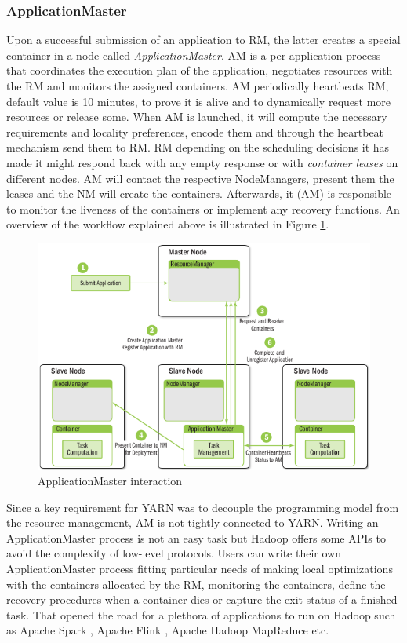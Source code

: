 \subsubsection{ApplicationMaster}
\label{sssec:am}
Upon a successful submission of an application to RM, the latter
creates a special container in a node called
\emph{ApplicationMaster}. AM is a per-application process that
coordinates the execution plan of the application, negotiates
resources with the RM and monitors the assigned containers. AM
periodically heartbeats RM, default value is 10 minutes, to prove it
is alive and to dynamically request more resources or release
some. When AM is launched, it will compute the necessary requirements
and locality preferences, encode them and through the heartbeat
mechanism send them to RM. RM depending on the scheduling decisions it
has made it might respond back with any empty response or with
\emph{container leases} on different nodes. AM will contact the
respective NodeManagers, present them the leases and the NM will
create the containers. Afterwards, it (AM) is responsible to monitor the liveness
of the containers or implement any recovery functions. An overview of
the workflow explained above is illustrated in Figure \ref{fig:yarn_am_rm_interaction}.

\begin{figure}
\centering
\includegraphics[scale=0.6]{resources/images/Background/AM_RM_interaction.png}
\caption{ApplicationMaster interaction \cite{Murthy:2014:AHY:2636998}}
\label{fig:yarn_am_rm_interaction}
\end{figure}

Since a key requirement for YARN was to decouple the programming model
from the resource management, AM is not tightly connected to YARN.
Writing an ApplicationMaster process is not an easy task but Hadoop
offers some APIs to avoid the complexity of low-level protocols.
Users can write their own ApplicationMaster
process fitting particular needs of making local optimizations with
the containers allocated by the RM, monitoring the containers,
define the recovery procedures when a container dies or capture the
exit status of a finished task. That opened the road for a plethora
of applications to run on Hadoop such as Apache Spark
\cite{apache_spark}, Apache Flink \cite{apache_flink}, Apache Hadoop
MapReduce \cite{apache_hadoop} etc.

